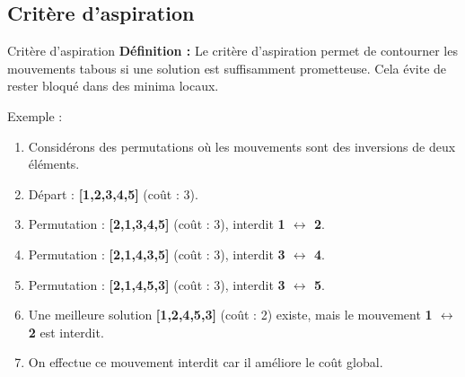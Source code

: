 \documentclass[10pt, handout]{beamer}
\begin{document}
\subsection{Critère d'aspiration}
\begin{frame}{Critère d'aspiration}
    \textbf{Définition :} Le critère d'aspiration permet de contourner les mouvements tabous si une solution est suffisamment prometteuse. Cela évite de rester bloqué dans des minima locaux.

    \begin{exampleblock}{Exemple :}
        \begin{enumerate}
            \item Considérons des permutations où les mouvements sont des inversions de deux
                  éléments.
            \item Départ : \textbf{[1,2,3,4,5]} (coût : 3).
            \item Permutation : \textbf{[2,1,3,4,5]} (coût : 3), interdit \textbf{1
                      $\leftrightarrow$ 2}.
            \item Permutation : \textbf{[2,1,4,3,5]} (coût : 3), interdit \textbf{3
                      $\leftrightarrow$ 4}.
            \item Permutation : \textbf{[2,1,4,5,3]} (coût : 3), interdit \textbf{3
                      $\leftrightarrow$ 5}.
            \item Une meilleure solution \textbf{[1,2,4,5,3]} (coût : 2) existe, mais le
                  mouvement \textbf{1 $\leftrightarrow$ 2} est interdit.
            \item On effectue ce mouvement interdit car il améliore le coût global.
        \end{enumerate}
    \end{exampleblock}
\end{frame}
\end{document}
